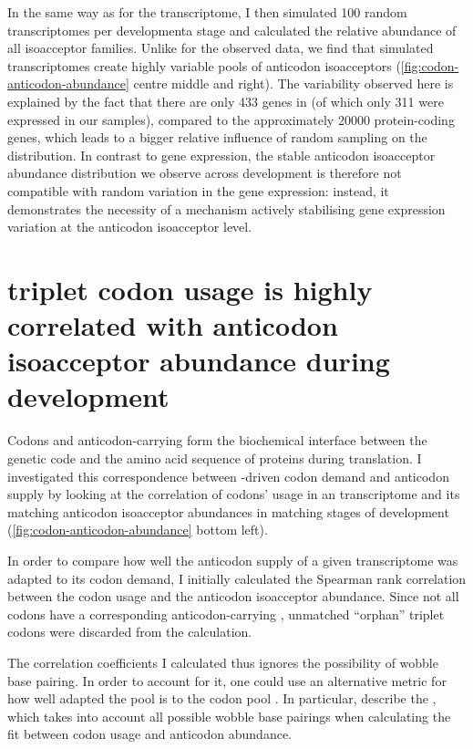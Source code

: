 In the same way as for the \mrna transcriptome, I then simulated \num{100}
random \trna transcriptomes per developmenta stage and calculated the relative
abundance of all isoacceptor families. Unlike for the observed \trna data, we
find that simulated \trna transcriptomes create highly variable pools of
anticodon isoacceptors (\cref{fig:codon-anticodon-abundance} centre middle and
right). The variability observed here is explained by the fact that there are
only \num{433} \trna genes in \mmu (of which only \num{311} were expressed in
our samples), compared to the approximately \num{20000} protein-coding genes,
which leads to a bigger relative influence of random sampling on the
distribution. In contrast to \mrna gene expression, the stable anticodon
isoacceptor abundance distribution we observe across development is therefore
not compatible with random variation in the \trna gene expression: instead, it
demonstrates the necessity of a mechanism actively stabilising \trna gene
expression variation at the anticodon isoacceptor level.

\section{ triplet codon usage is highly correlated with 
anticodon isoacceptor abundance during development}

Codons and anticodon-carrying \trna[s] form the biochemical interface between
the genetic code and the amino acid sequence of proteins during \mrna
translation. I investigated this correspondence between \mrna-driven codon
demand and \trna anticodon supply by looking at the correlation of codons’ usage
in an \mrna transcriptome and its matching \trna anticodon isoacceptor
abundances in matching stages of development
(\cref{fig:codon-anticodon-abundance} bottom left).

In order to compare how well the anticodon supply of a given transcriptome was
adapted to its codon demand, I initially calculated the Spearman rank
correlation between the codon usage and the anticodon isoacceptor abundance.
Since not all codons have a corresponding anticodon-carrying \trna, unmatched
“orphan” triplet codons were discarded from the calculation.

The correlation coefficients I calculated thus ignores the possibility of
wobble base pairing. In order to account for it, one could use an alternative
metric for how well adapted the \trna pool is to the codon pool
\citep{Gingold:2011}. In particular, \citet{Dos_Reis:2004} describe the \tai,
which takes into account all possible wobble base pairings when calculating the
fit between codon usage and anticodon abundance.


